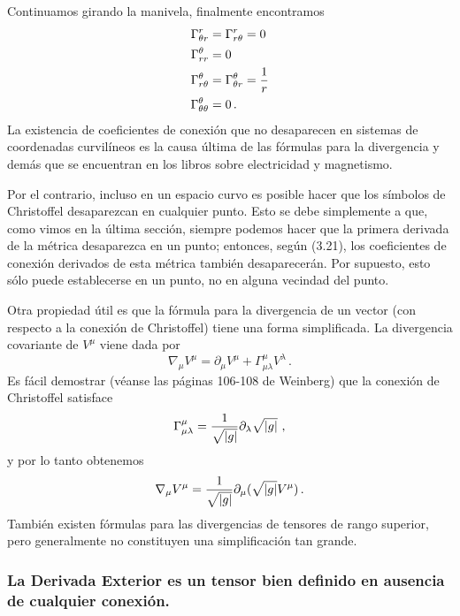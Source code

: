 \documentclass[11pt,b5paper,openany,twoside]{book}
\newcommand{\p}[1]{{\partial_{#1}}}
\begin{document}
Continuamos girando la manivela, finalmente encontramos
\begin{align}
\Gamma^r_{\theta r} &=  \Gamma^r_{r\theta} = 0 \notag \\
\Gamma^\theta_{rr} &=  0 \notag \\
\Gamma^\theta_{r\theta} &=  \Gamma^\theta_{\theta r} = {1\over r} \notag \\
\Gamma^\theta_{\theta\theta} &=  0\,. \label{3.25}
\end{align}
La existencia de coeficientes de conexión que no desaparecen en sistemas de coordenadas curvilíneos es la causa última de las fórmulas para la divergencia y demás que se encuentran en los libros sobre electricidad y magnetismo.

Por el contrario, incluso en un espacio curvo es posible hacer que los símbolos de Christoffel desaparezcan en cualquier punto.
Esto se debe simplemente a que, como vimos en la última sección, siempre podemos hacer que la primera derivada de la métrica desaparezca en un punto; entonces, según (3.21), los coeficientes de conexión derivados de esta métrica también desaparecerán.
Por supuesto, esto sólo puede establecerse en un punto, no en alguna vecindad del punto.

Otra propiedad útil es que la fórmula para la divergencia de un vector (con respecto a la conexión de Christoffel) tiene una forma simplificada.
La divergencia covariante de $V^\mu$ viene dada por
\begin{equation}
\nabla_\mu V^\mu = \p\mu V^\mu +\Gamma^\mu_{\mu\lambda}V^\lambda
\,.\label{3.26}
\end{equation}
Es fácil demostrar (véanse las páginas 106-108 de Weinberg) que la conexión de Christoffel satisface
\begin{equation}
\Gamma^\mu_{\mu\lambda}= {1\over{\sqrt{|g|}}}\p\lambda
\sqrt{|g|}\ ,\label{3.27}
\end{equation}
y por lo tanto obtenemos
\begin{equation}
\nabla_\mu V^\mu = {1\over{\sqrt{|g|}}}\p\mu(\sqrt{|g|}V^\mu)
\,.\label{3.28}
\end{equation}
También existen fórmulas para las divergencias de tensores de rango superior, pero generalmente no constituyen una simplificación tan grande.

\subsubsection{La Derivada Exterior es un tensor bien definido en ausencia de cualquier conexión.}
\end{document}
